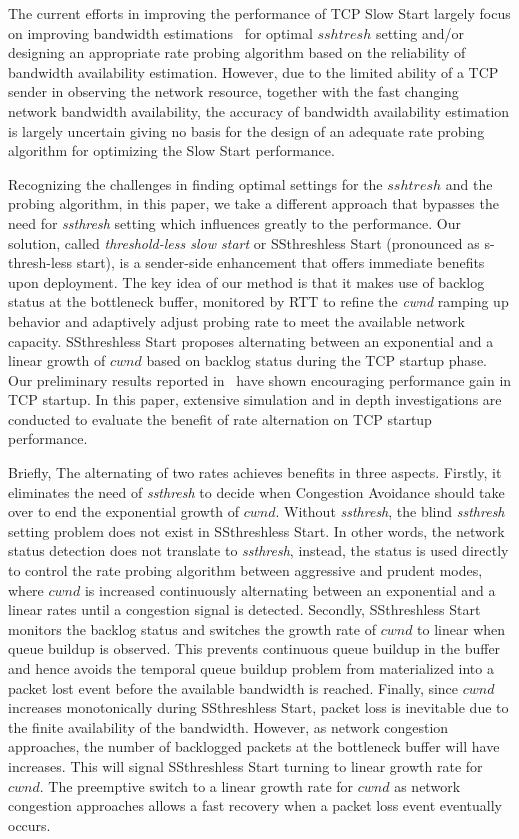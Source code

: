 \documentclass[12pt,onecolumn]{IEEEtran}
\begin{document}
The current efforts in improving the performance of TCP Slow Start largely
focus on improving bandwidth
estimations~\cite{buffer1,buffer2,buffer3,westwood,RCE} for optimal $sshtresh$
setting and/or designing an appropriate rate probing algorithm based on the
reliability of bandwidth availability estimation. However, due to the limited
ability of a TCP sender in observing the network resource, together with the
fast changing network bandwidth availability, the accuracy of bandwidth
availability estimation is largely uncertain giving no basis for the design of
an adequate rate probing algorithm for optimizing the Slow Start performance.

Recognizing the challenges in finding optimal settings for the $sshtresh$ and
the probing algorithm, in this paper, we take a different approach that
bypasses the need for \emph{ssthresh} setting which influences greatly to the
performance. Our solution, called \emph{threshold-less slow start} or
SSthreshless Start (pronounced as s-thresh-less start), is a sender-side
enhancement that offers immediate benefits upon deployment. The key idea of our
method is that it makes use of backlog status at the bottleneck buffer,
monitored by RTT to refine the \emph{cwnd} ramping up behavior and adaptively
adjust probing rate to meet the available network capacity. SSthreshless Start
proposes alternating between an exponential and a linear growth of $cwnd$ based
on backlog status during the TCP startup phase. Our preliminary results
reported in~\cite{Lu2010} have shown encouraging performance gain in TCP
startup. In this paper, extensive simulation and in depth investigations are
conducted to evaluate the benefit of rate alternation on TCP startup
performance.

Briefly, The alternating of two rates achieves benefits in three aspects.
Firstly, it eliminates the need of \emph{ssthresh} to decide when Congestion
Avoidance should take over to end the exponential growth of $cwnd$. Without
\emph{ssthresh}, the blind \emph{ssthresh} setting problem does not exist in
SSthreshless Start. In other words, the network status detection does not
translate to \emph{ssthresh}, instead, the status is used directly to control
the rate probing algorithm between aggressive and prudent modes, where $cwnd$
is increased continuously alternating between an exponential and a linear rates
until a congestion signal is detected. Secondly, SSthreshless Start monitors
the backlog status and switches the growth rate of $cwnd$ to linear when queue
buildup is observed. This prevents continuous queue buildup in the buffer and
hence avoids the temporal queue buildup problem from materialized into a packet
lost event before the available bandwidth is reached. Finally, since $cwnd$
increases monotonically during SSthreshless Start, packet loss is inevitable
due to the finite availability of the bandwidth. However, as network congestion
approaches, the number of backlogged packets at the bottleneck buffer will have
increases. This will signal SSthreshless Start turning to linear growth rate
for $cwnd$. The preemptive switch to a linear growth rate for $cwnd$ as network
congestion approaches allows a fast recovery when a packet loss event
eventually occurs.
\end{document}
